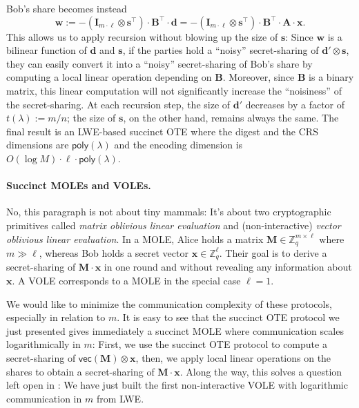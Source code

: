 \documentclass{theoretics}
\newcommand{\Z}{\mathbb{Z}}
\newcommand{\poly}{\mathsf{poly}}
\renewcommand{\sec}{\ensuremath{\lambda}}
\newcommand{\id}{\ensuremath{\mathbf{I}}}
\begin{document}
Bob's share becomes instead
\[\mathbf{w}:=-(\id_{m\cdot \ell}\otimes \mathbf{s}^\intercal) \cdot \mathbf{B}^\intercal\cdot \mathbf{d}=-(\id_{m\cdot \ell}\otimes \mathbf{s}^\intercal) \cdot \mathbf{B}^\intercal\cdot\mathbf{A}\cdot \mathbf{x}.\]
This allows us to apply recursion without blowing up the size of $\mathbf{s}$: Since $\mathbf{w}$ is a bilinear function of $\mathbf{d}$ and $\mathbf{s}$, if the parties hold a ``noisy'' secret-sharing of $\mathbf{d}'\otimes \mathbf{s}$, they can easily convert it into a ``noisy'' secret-sharing of Bob's share by computing a local linear operation depending on $\mathbf{B}$. Moreover, since $\mathbf{B}$ is a binary matrix, this linear computation will not significantly increase the ``noisiness'' of the secret-sharing. At each recursion step, the size of $\mathbf{d}'$ decreases by a factor of $t(\sec):=m/n$; the size of $\mathbf{s}$, on the other hand, remains always the same. The final result is an LWE-based succinct OTE where the digest and the CRS dimensions are $\poly(\sec)$ and the encoding dimension is $O(\log M)\cdot \ell\cdot \poly(\sec)$. 

\paragraph{Succinct MOLEs and VOLEs.} No, this paragraph is not about tiny mammals: It's about two cryptographic primitives called \emph{matrix oblivious linear evaluation} and (non-interactive) \emph{vector oblivious linear evaluation}. In a MOLE, Alice holds a matrix $\mathbf{M}\in\Z_q^{m\times \ell}$ where $m\gg \ell$, whereas Bob holds a secret vector $\mathbf{x}\in\Z_q^\ell$. Their goal is to derive a secret-sharing of $\mathbf{M}\cdot \mathbf{x}$ in one round and without revealing any information about $\mathbf{x}$. A VOLE corresponds to a MOLE in the special case $\ell=1$. 

We would like to minimize the communication complexity of these protocols, especially in relation to $m$. It is easy to see that the succinct OTE protocol we just presented gives immediately a succinct MOLE where communication scales logarithmically in $m$: First, we use the succinct OTE protocol to compute a secret-sharing of $\mathsf{vec}(\mathbf{M})\otimes \mathbf{x}$, then, we apply local linear operations on the shares to obtain a secret-sharing of $\mathbf{M}\cdot \mathbf{x}$. Along the way, this solves a question left open in \cite{EC:AbrRoySch24}: We have just built the first non-interactive VOLE with logarithmic communication in $m$ from LWE.
\end{document}
